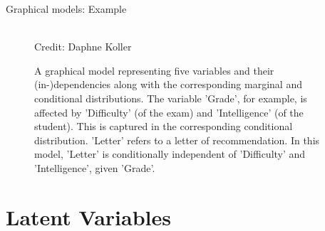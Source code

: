 \begin{frame}{Graphical models: Example}

  \begin{figure}
    \centering
    \tiny{\\Credit: Daphne Koller}
    \caption{\footnotesize A graphical model representing five variables and their (in-)dependencies along with the corresponding marginal and conditional distributions. The variable 'Grade', for example, is affected by 'Difficulty' (of the exam) and 'Intelligence' (of the student). This is captured in the corresponding conditional distribution. 'Letter' refers to a letter of recommendation. In this model, 'Letter' is conditionally independent of 'Difficulty' and 'Intelligence', given 'Grade'.}
  \end{figure}

\end{frame}


\section{Latent Variables}

%     
%     

